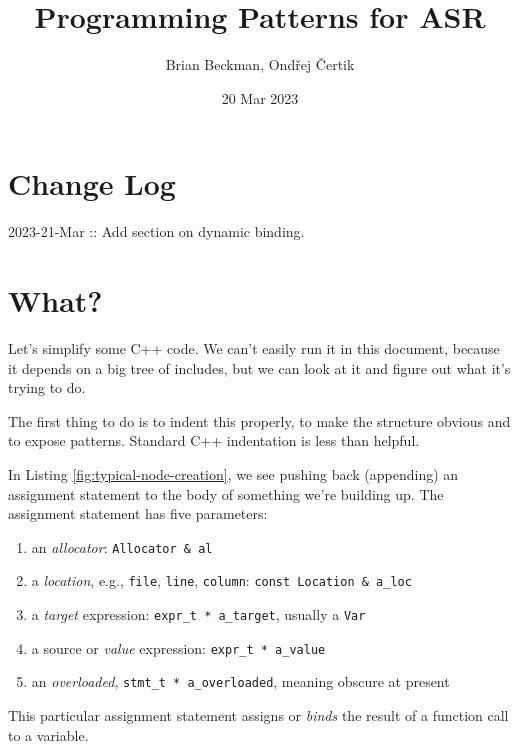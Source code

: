 \documentclass[10pt,oneside,x11names]{article}
\author{Brian Beckman, Ondřej Čertik}
\date{20 Mar 2023}
\title{Programming Patterns for ASR}
\begin{document}
\maketitle
\setcounter{tocdepth}{2}
\tableofcontents

\setlength\parindent{0pt}

\section{Change Log}
\label{sec:org91c10ca}

2023-21-Mar :: Add section on dynamic binding.

\section{What?}
\label{sec:orgd55e568}

Let's simplify some C++ code. We can't easily run it in this
document, because it depends on a big tree of includes, but we can
look at it and figure out what it's trying to do.

The first thing to do is to indent this properly, to make the
structure obvious and to expose patterns. Standard C++ indentation
is less than helpful.

In Listing \ref{fig:typical-node-creation}, we see pushing back
(appending) an assignment statement to the body of something we're
building up. The assignment statement has five parameters:

\begin{enumerate}
\item an \emph{allocator}: \texttt{Allocator & al}

\item a \emph{location}, e.g., \texttt{file}, \texttt{line}, \texttt{column}: \texttt{const Location & a_loc}

\item a \emph{target} expression: \texttt{expr_t * a_target},
usually a \texttt{Var}

\item a source or \emph{value} expression: \texttt{expr_t * a_value}

\item an \emph{overloaded}, \texttt{stmt_t * a_overloaded},
meaning obscure at present
\end{enumerate}

This particular assignment statement assigns or \emph{binds} the result
of a function call to a variable.
\end{document}
